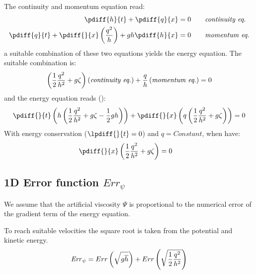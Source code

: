 The continuity and momentum equation read:
\begin{align}
    \pdiff{h}{t}  + \pdiff{q}{x} & = 0 \qquad \textit{continuity eq.}
    \\
    \pdiff{q}{t}  + \pdiff{}{x} \left( \frac{q^2}{h} \right) + g h \pdiff{h}{x} & = 0 \qquad \textit{momentum eq.}
\end{align}
a suitable combination of these two equations yields the energy equation.
The suitable combination is:
\begin{align}
    \left( \frac{1}{2} \frac{q^2}{h^2} + g \zeta\right)\left(\textit{continuity eq.}\right)
    +
    \frac{q}{h} \left( \textit{momentum eq.} \right)= 0
\end{align}
and the energy equation reads (\label{sec:obtaining_1denergy_equation}):
\begin{align}
    \pdiff{}{t}\left( h \left(\half \frac{q^2}{h^2} + g \zeta - \half g h \right) \right) +
    \pdiff{}{x}\left( q \left( \half \frac{q^2}{h^2} + g\zeta  \right) \right)= 0
\end{align}
With energy conservation ($\lpdiff{}{t} = 0$) and $q=\textit{Constant}$, when have:
\begin{align}
    &\pdiff{}{x}\left( \frac{1}{2} \frac{q^2}{h^2} + g\zeta  \right) = 0
\end{align}

\subsection{1D Error function $\mathit{Err}_\psi$} \label{sec:err_psi_1d}

We assume that the artificial viscosity $\Psi$ is proportional to the numerical error of the gradient term of the energy equation.

To reach suitable velocities the square root is taken from the potential and kinetic energy.
\begin{align}
    \mathit{Err}_{\psi} = Err \left( \sqrt{g \overline{h}} \right) + Err \left( \sqrt{\frac{1}{2} \frac{q^2}{h^2} } \right)
\end{align}
%
